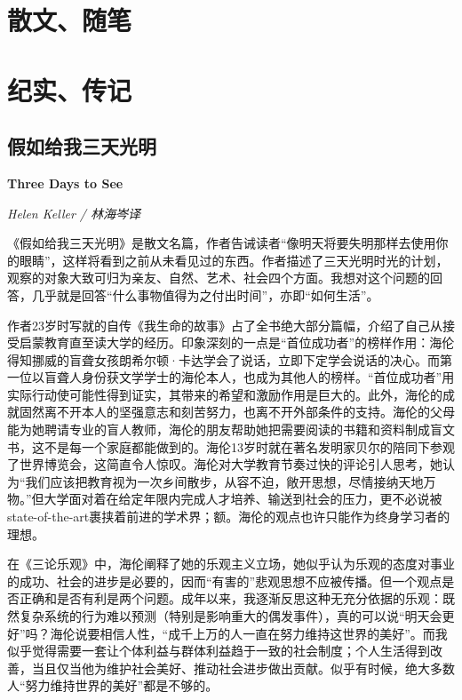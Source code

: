 \section{散文、随笔}

\section{纪实、传记}

\subsection*{假如给我三天光明}
\par \textbf{Three Days to See}
\par \emph{Helen Keller / 林海岑译} 
\par 《假如给我三天光明》是散文名篇，作者告诫读者“像明天将要失明那样去使用你的眼睛”，这样将看到之前从未看见过的东西。作者描述了三天光明时光的计划，观察的对象大致可归为亲友、自然、艺术、社会四个方面。我想对这个问题的回答，几乎就是回答“什么事物值得为之付出时间”，亦即“如何生活”。
\par 作者23岁时写就的自传《我生命的故事》占了全书绝大部分篇幅，介绍了自己从接受启蒙教育直至读大学的经历。印象深刻的一点是“首位成功者”的榜样作用：海伦得知挪威的盲聋女孩朗希尔顿·卡达学会了说话，立即下定学会说话的决心。而第一位以盲聋人身份获文学学士的海伦本人，也成为其他人的榜样。“首位成功者”用实际行动使可能性得到证实，其带来的希望和激励作用是巨大的。此外，海伦的成就固然离不开本人的坚强意志和刻苦努力，也离不开外部条件的支持。海伦的父母能为她聘请专业的盲人教师，海伦的朋友帮助她把需要阅读的书籍和资料制成盲文书，这不是每一个家庭都能做到的。海伦13岁时就在著名发明家贝尔的陪同下参观了世界博览会，这简直令人惊叹。海伦对大学教育节奏过快的评论引人思考，她认为“我们应该把教育视为一次乡间散步，从容不迫，敞开思想，尽情接纳天地万物。”但大学面对着在给定年限内完成人才培养、输送到社会的压力，更不必说被state-of-the-art裹挟着前进的学术界；额。海伦的观点也许只能作为终身学习者的理想。
\par 在《三论乐观》中，海伦阐释了她的乐观主义立场，她似乎认为乐观的态度对事业的成功、社会的进步是必要的，因而“有害的”悲观思想不应被传播。但一个观点是否正确和是否有利是两个问题。成年以来，我逐渐反思这种无充分依据的乐观：既然复杂系统的行为难以预测（特别是影响重大的偶发事件），真的可以说“明天会更好”吗？海伦说要相信人性，“成千上万的人一直在努力维持这世界的美好”。而我似乎觉得需要一套让个体利益与群体利益趋于一致的社会制度；个人生活得到改善，当且仅当他为维护社会美好、推动社会进步做出贡献。似乎有时候，绝大多数人“努力维持世界的美好”都是不够的。
\par {}

